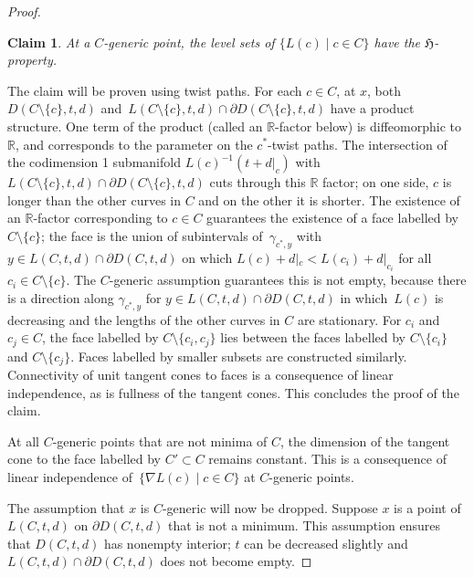\documentclass[pdftex]{sigma}
\numberwithin{equation}{section}
\newtheorem*{Claim}{Claim}
{ \theoremstyle{definition}
 \newtheorem{Definition}[Theorem]{Definition}
 \newtheorem{Note}[Theorem]{Note}
 \newtheorem{Example}[Theorem]{Example}
 \newtheorem{Remark}[Theorem]{Remark}
 \newtheorem{observation}[Theorem]{Observation}
}
\begin{document}
\begin{proof}
\begin{Claim} At a $C$-generic point, the level sets of $\{L(c) \mid c\in C\}$ have the $\mathfrak{H}$-property.
\end{Claim}

The claim will be proven using twist paths. For each $c\in C$, at $x$, both $D(C\setminus \{c\},t,d)$ and~${L(C\setminus \{c\},t,d)\cap \partial D(C\setminus \{c\},t,d)}$ have a product structure. One term of the product (called an $\mathbb{R}$-factor below) is diffeomorphic to $\mathbb{R}$, and corresponds to the parameter on the $c^{*}$-twist paths. The intersection of the codimension 1 submanifold $L(c)^{-1}(t+d|_{c})$ with $L(C\setminus \{c\},t,d)\cap \partial D(C\setminus \{c\},t,d)$ cuts through this $\mathbb{R}$ factor; on one side, $c$ is longer than the other curves in $C$ and on the other it is shorter. The existence of an $\mathbb{R}$-factor corresponding to $c\in C$ guarantees the existence of a face labelled by $C\setminus \{c\}$; the face is the union of subintervals of~$\gamma_{c^{*},y}$ with~${y\in L(C,t,d)\cap \partial D(C,t,d)}$ on which $L(c)+d|_{c}<L(c_{i})+d|_{c_{i}}$ for all $c_{i}\in C\setminus \{c\}$. The $C$-generic assumption guarantees this is not empty, because there is a direction along $\gamma_{c^{*},y}$ for $y\in L(C,t,d)\cap \partial D(C,t,d)$ in which~$L(c)$ is decreasing and the lengths of the other curves in $C$ are stationary. For $c_{i}$ and $c_{j}\in C$, the face labelled by $C\setminus \{c_{i}, c_{j}\}$ lies between the faces labelled by $C\setminus \{c_{i}\}$ and $C\setminus \{c_{j}\}$. Faces labelled by smaller subsets are constructed similarly. Connectivity of unit tangent cones to faces is a consequence of linear independence, as is fullness of the tangent cones. This concludes the proof of the claim.

At all $C$-generic points that are not minima of $C$, the dimension of the tangent cone to the face labelled by $C'\subset C$ remains constant. This is a consequence of linear independence of~${\{\nabla L(c) \mid c\in C\}}$ at $C$-generic points.

The assumption that $x$ is $C$-generic will now be dropped. Suppose $x$ is a point of $L(C,t,d)$ on $\partial D(C,t,d)$ that is not a minimum. This assumption ensures that $D(C,t,d)$ has nonempty interior; $t$ can be decreased slightly and $L(C,t,d)\cap\partial D(C,t,d)$ does not become empty.


\end{proof}
\end{document}
